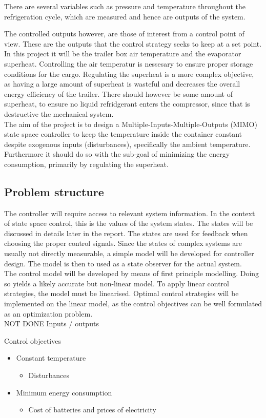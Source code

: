 There are several variables such as pressure and temperature throughout the refrigeration cycle, which are measured and hence are outputs of the system. 

The controlled outputs however, are those of interest from a control point of view. These are the outputs that the control strategy seeks to keep at a set point. In this project it will be the trailer box air temperature and the evaporator superheat. Controlling the air temperatur is nessesary to ensure proper storage conditions for the cargo. Regulating the superheat is a more complex objective, as having a large amount of superheat is wasteful and decreases the overall energy efficiency of the trailer. There should however be some amount of superheat, to ensure no liquid refridgerant enters the compressor, since that is destructive the mechanical system.\\

The aim of the project is to design a Multiple-Inputs-Multiple-Outputs (MIMO) state space controller to keep the temperature inside the container constant despite exogenous inputs (disturbances), specifically the ambient temperature. Furthermore it should do so with the sub-goal of minimizing the energy consumption, primarily by regulating the superheat.

\subsection{Problem structure}

The controller will require access to relevant system information. In the context of state space control, this is the values of the system states. The states will be discussed in details later in the report. The states are used for feedback when choosing the proper control signals. Since the states of complex systems are usually not directly measurable, a simple model will be developed for controller design. The model is then to used as a state observer for the actual system. \\

The control model will be developed by means of first principle modelling. Doing so yields a likely accurate but non-linear model. To apply linear control strategies, the model must be linearised. Optimal control strategies will be implemented on the linear model, as the control objectives can be well formulated as an optimization problem.\\



	
NOT DONE
Inputs / outputs

Control objectives
\begin{itemize}
	\item Constant temperature
		\begin{itemize}
			\item Disturbances
		\end{itemize}
	\item Minimum energy consumption
		\begin{itemize}
			\item Cost of batteries and prices of electricity
		\end{itemize}
\end{itemize}

		
